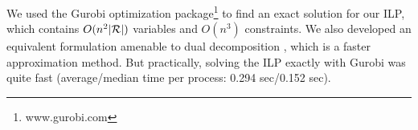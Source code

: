 We used the Gurobi optimization package\footnote{www.gurobi.com} to find an exact solution for our ILP, which contains $O(n^2|\mathcal{R}|)$ variables and $O(n^3)$ constraints. We also developed an equivalent formulation amenable to dual decomposition \cite{dualdecomp}, which is a faster approximation method. But practically, solving the ILP exactly with Gurobi was quite fast (average/median time per process: 0.294 sec/0.152 sec).



